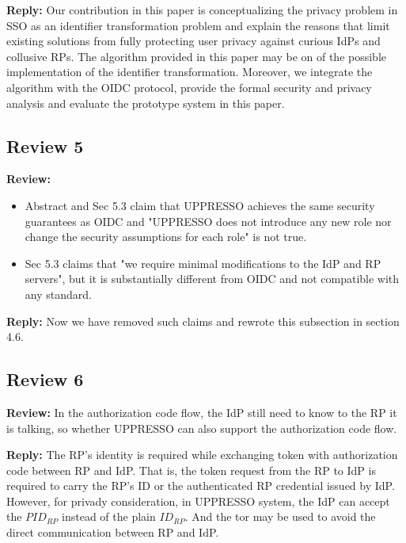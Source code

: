 \documentclass[letterpaper,onecolumn,10pt]{article}
\begin{document}
\vspace{1mm}\noindent\textbf{Reply:}
Our contribution in this paper is conceptualizing the
privacy problem in SSO as an identifier transformation problem and explain the reasons that limit existing solutions from fully protecting user privacy against curious IdPs and collusive RPs.
The algorithm provided in this paper may be on of the possible implementation of the identifier transformation.
Moreover, we integrate the algorithm with the OIDC protocol, provide the formal security and privacy analysis and evaluate the prototype system in this paper.

\subsection*{Review 5}
\vspace{1mm}\noindent\textbf{Review:}
\begin{itemize}
\item Abstract and Sec 5.3 claim that UPPRESSO achieves the same security guarantees as OIDC and "UPPRESSO does not introduce any new role nor change the security assumptions for each role" is not true.
 \item Sec 5.3 claims that "we require minimal modifications to the IdP and RP servers", but it is substantially different from OIDC and not compatible with any standard.

\end{itemize}


\vspace{1mm}\noindent\textbf{Reply:}
Now we have removed such claims and rewrote this subsection in section 4.6.

\subsection*{Review 6}
\vspace{1mm}\noindent\textbf{Review:}
In the authorization code flow, the IdP still need to know to the RP it is talking, so whether UPPRESSO can also support the authorization code flow.

\vspace{1mm}\noindent\textbf{Reply:}
The RP's identity is required while exchanging token with authorization code between RP and IdP.
That is, the token request from the RP to IdP is required to carry the RP's ID or the authenticated RP credential issued by IdP.
However, for privady consideration, in UPPRESSO system, the IdP can accept the $PID_{RP}$ instead of the plain $ID_{RP}$.
And the tor may be used to avoid the direct communication between RP and IdP.
\end{document}
